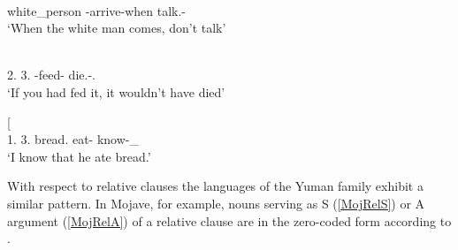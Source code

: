 \begin{exe}\ex\label{WapTempCl}
\begin{xlist}
\ex\gll  {\rm[}  \textipa{tu-lePa-cel'}{\rm]} \\
\hspaceThis{[}\dem{} white\_person \dir{}-arrive-when talk.\ipfv{}-\Neg{}\\
\glt `When the white man comes, don't talk' %

\ex\gll  {\rm[}   \textipa{cel'}{\rm]}  \\
\hspaceThis{[}2\sg{}.\acc{} 3\sg{}.\acc{} \uop{}-feed-\caus{} \cond{} \opt{} die.\imp{}-\Neg{}.\Hyp{}\\
\glt `If you had fed it, it wouldn't have died' %

\ex\gll{}  {\rm[}\textbf{}  \textipa{paP-tah}{\rm]} \\
1\sg{}.\nom{} \hspaceThis{[}3\sg{}.\acc{} bread.\acc{} eat-\pst{} know-\Non\_\fut{}\\
\glt `I know that he ate bread.' 
\end{xlist}
\end{exe}

With respect to relative clauses the languages of the Yuman family exhibit a similar pattern.
In Mojave, for example, nouns serving as S (\ref{MojRelS}) or A argument (\ref{MojRelA}) of a relative clause are in the zero-coded form according to \citet[187--190]{Munro:1976}.

